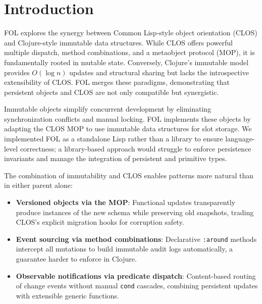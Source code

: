 \documentclass[sigconf,nonacm,review]{acmart}
\begin{document}


\maketitle

\section{Introduction}

FOL explores the synergy between Common Lisp-style object orientation (CLOS) and Clojure-style immutable data structures. While CLOS offers powerful multiple dispatch, method combinations, and a metaobject protocol (MOP), it is fundamentally rooted in mutable state. Conversely, Clojure's immutable model provides $O(\log n)$ updates and structural sharing but lacks the introspective extensibility of CLOS. FOL merges these paradigms, demonstrating that persistent objects and CLOS are not only compatible but synergistic.

Immutable objects simplify concurrent development by eliminating synchronization conflicts and manual locking. FOL implements these objects by adapting the CLOS MOP to use immutable data structures for slot storage. We implemented FOL as a standalone Lisp rather than a library to ensure language-level correctness; a library-based approach would struggle to enforce persistence invariants and manage the integration of persistent and primitive types.

The combination of immutability and CLOS enables patterns more natural than in either parent alone:
\begin{itemize}
\item \textbf{Versioned objects via the MOP}: Functional updates transparently produce instances of the new schema while preserving old snapshots, trading CLOS's explicit migration hooks for corruption safety.
\item \textbf{Event sourcing via method combinations}: Declarative \texttt{:around} methods intercept all mutations to build immutable audit logs automatically, a guarantee harder to enforce in Clojure.
\item \textbf{Observable notifications via predicate dispatch}: Content-based routing of change events without manual \texttt{cond} cascades, combining persistent updates with extensible generic functions.
\end{itemize}
\end{document}
